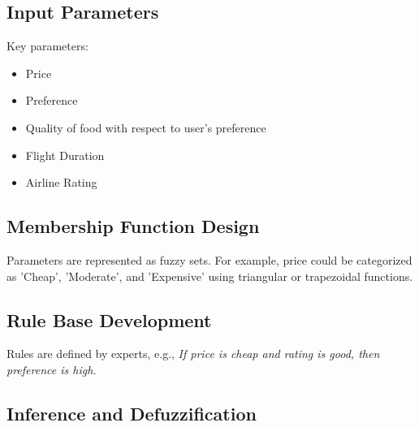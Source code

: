 \documentclass[a4paper]{article}
\begin{document}
\subsection{Input Parameters}
Key parameters:
\begin{itemize}
\item Price
\item Preference
\item Quality of food with respect to user's preference
\item Flight Duration
\item Airline Rating
\end{itemize}

\subsection{Membership Function Design}
Parameters are represented as fuzzy sets. For example, price could be categorized as 'Cheap', 'Moderate', and 'Expensive' using triangular or trapezoidal functions.

\subsection{Rule Base Development}
Rules are defined by experts, e.g.,
\textit{If price is cheap and rating is good, then preference is high.}

\subsection{Inference and Defuzzification}






\end{document}
